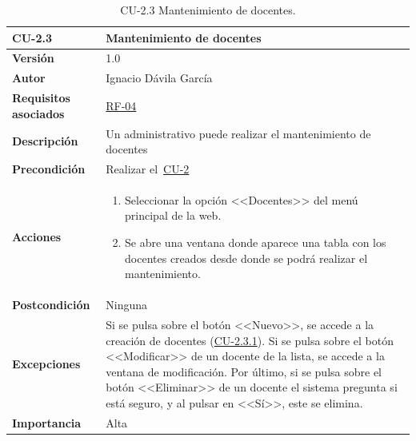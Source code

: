 \begin{table}[p]
\label{table:CU-2.3}
	\centering
	\begin{tabularx}{\linewidth}{ p{} p{} }
		\toprule
		\textbf{CU-2.3}    & \textbf{Mantenimiento de docentes}\\
		\toprule
		\textbf{Versión}              & 1.0    \\
		\textbf{Autor}                & Ignacio Dávila García \\
		\textbf{Requisitos asociados} & \hyperref[itm:RF4]{RF-04} \\
		\textbf{Descripción}          & Un administrativo puede realizar el mantenimiento de docentes \\
		\textbf{Precondición}         & Realizar el~\hyperref[table:CU-2]{CU-2} \\
		\textbf{Acciones}             &
		\begin{enumerate}
			\def\labelenumi{\arabic{enumi}.}
			\tightlist
			\item Seleccionar la opción <<Docentes>> del menú principal de la web.
			\item Se abre una ventana donde aparece una tabla con los docentes creados desde donde se podrá realizar el mantenimiento.
		\end{enumerate}\\
		\textbf{Postcondición}        & Ninguna \\
		\textbf{Excepciones}          & Si se pulsa sobre el botón <<Nuevo>>, se accede a la creación de docentes (\hyperref[table:CU-2.3.1]{CU-2.3.1}). Si se pulsa sobre el botón <<Modificar>> de un docente de la lista, se accede a la ventana de modificación. Por último, si se pulsa sobre el botón <<Eliminar>> de un docente el sistema pregunta si está seguro, y al pulsar en <<Sí>>, este se elimina. \\
		\textbf{Importancia}          & Alta \\
		\bottomrule
	\end{tabularx}
	\caption{CU-2.3 Mantenimiento de docentes.}
\end{table}
\FloatBarrier

